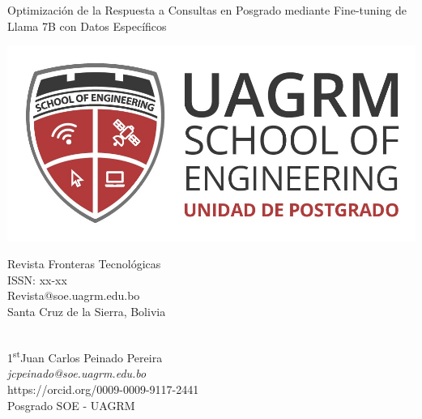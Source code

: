 \documentclass[12pt,twocolumn]{article}
\begin{document}
    \begin{titlepage}
        \centering
        \thispagestyle{empty}
        {\Huge Optimización de la Respuesta a Consultas en Posgrado mediante Fine-tuning de Llama 7B con Datos Específicos \\}
        \vspace{3cm}
    \begin{minipage}[t]{0.3\textwidth}
        \vspace{0pt}
        \includegraphics[width=\linewidth]{logo3}
    \end{minipage}\vline
    \begin{minipage}[t]{0.4\textwidth}
        \vspace{5pt}
        { \small Revista Fronteras Tecnológicas}\\
        { \small ISSN: xx-xx}\\
        { \small Revista@soe.uagrm.edu.bo}\\
        { \small Santa Cruz de la Sierra, Bolivia}
    \end{minipage}\\
    \vspace{3cm}
    {\Large {1\textsuperscript{st}Juan Carlos Peinado Pereira}}\\
    {\textit{jcpeinado@soe.uagrm.edu.bo}}\\
    {\small https://orcid.org/0009-0009-9117-2441}\\
    {\small Posgrado SOE - UAGRM}\\
    \end{titlepage}
\titlespacing*{\section}{0pt}{0cm}{0cm}
\titlespacing*{\subsection}{0pt}{0cm}{0cm}
\end{document}
